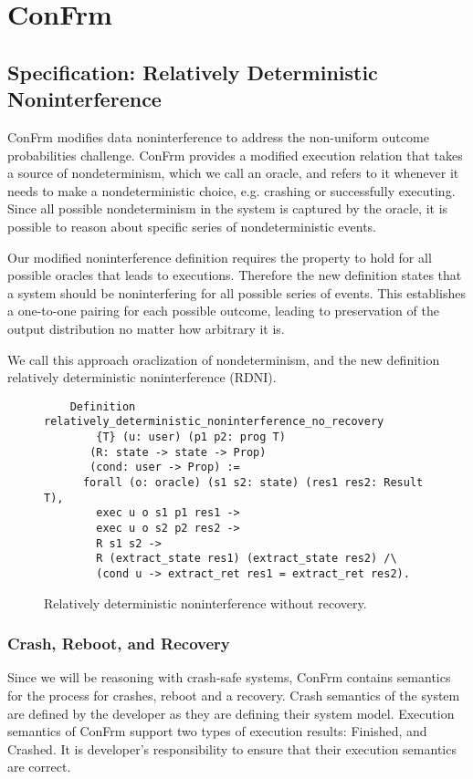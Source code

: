 \chapter{ConFrm}

\section{Specification: Relatively Deterministic Noninterference}
ConFrm modifies data noninterference to address the non-uniform outcome probabilities challenge. ConFrm provides a modified execution relation that takes a source of nondeterminism, which we call an oracle, and refers to it whenever it needs to make a nondeterministic choice, e.g. crashing or successfully executing. Since all possible nondeterminism in the system is captured by the oracle, it is possible to reason about specific series of nondeterministic events.

Our modified noninterference definition requires the property to hold for all possible oracles that leads to executions. Therefore the new definition states that a system should be noninterfering for all possible series of events. This establishes a one-to-one pairing for each possible outcome, leading to preservation of the output distribution no matter how arbitrary it is.

We call this approach oraclization of nondeterminism, and the new definition relatively deterministic noninterference (RDNI).

\begin{figure}[ht]
    \centering
    \begin{verbatim}
    Definition relatively_deterministic_noninterference_no_recovery
        {T} (u: user) (p1 p2: prog T)
       (R: state -> state -> Prop)
       (cond: user -> Prop) :=
      forall (o: oracle) (s1 s2: state) (res1 res2: Result T),
        exec u o s1 p1 res1 ->
        exec u o s2 p2 res2 ->
        R s1 s2 ->
        R (extract_state res1) (extract_state res2) /\
        (cond u -> extract_ret res1 = extract_ret res2).
    \end{verbatim}
    \caption{Relatively deterministic noninterference without recovery.}
    \label{fig:RDNI_no_recovery}
\end{figure}

\subsection{Crash, Reboot, and Recovery}
Since we will be reasoning with crash-safe systems, ConFrm contains semantics for the process for crashes, reboot and a recovery. Crash semantics of the system are defined by the developer as they are defining their system model. Execution semantics of ConFrm support two types of execution results: Finished, and Crashed. It is developer's responsibility to ensure that their execution semantics are correct.

